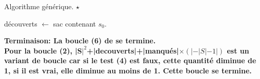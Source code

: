 \documentclass[french, 11pt]{article}
\begin{document}
\begin{defi}{Algorithme générique. $\star$}{}
    \begin{algorithm}[H]
        \LinesNumbered
        \caption{Parcours générique.}
        découverts $\gets$ sac contenant $s_0$.\\
    \end{algorithm}
    \bf{Terminaison:} La boucle (6) de se termine.\\
    Pour la boucle (2), |S$|^2$+|decouverts|+|manqués|$\times(|-|S|-1|)$ est un variant de boucle car si le test (4) est faux, cette quantité diminue de 1, si il est vrai, elle diminue au moins de 1. Cette boucle se termine.
\end{defi}

\pagebreak
\end{document}

